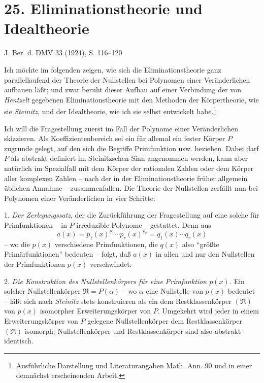 \documentclass[11pt]{article}
\begin{document}
\section*{25. Eliminationstheorie und Idealtheorie}

\begin{center}
J. Ber. d. DMV 33 (1924), S. 116--120
\end{center}

Ich möchte im folgenden zeigen, wie sich die Eliminationstheorie ganz parallellaufend der Theorie der Nullstellen bei Polynomen einer Veränderlichen aufbauen läßt; und zwar beruht dieser Aufbau auf einer Verbindung der von \emph{Hentzelt} gegebenen Eliminationstheorie mit den Methoden der Körpertheorie, wie sie \emph{Steinitz}, und der Idealtheorie, wie ich sie selbst entwickelt habe.\footnote{Ausführliche Darstellung und Literaturangaben Math. Ann. 90 und in einer demnächst erscheinenden Arbeit.}

Ich will die Fragestellung zuerst im Fall der Polynome einer Veränderlichen skizzieren. Als Koeffizientenbereich sei ein für allemal ein fester Körper $P$ zugrunde gelegt, auf den sich die Begriffe Primfunktion usw. beziehen. Dabei darf $P$ als abstrakt definiert im Steinitzschen Sinn angenommen werden, kann aber natürlich im Spezialfall mit dem Körper der rationalen Zahlen oder dem Körper aller komplexen Zahlen -- nach der in der Eliminationstheorie früher allgemein üblichen Annahme -- zusammenfallen. Die Theorie der Nullstellen zerfällt nun bei Polynomen einer Veränderlichen in vier Schritte:

1. \emph{Der Zerlegungssatz}, der die Zurückführung der Fragestellung auf eine solche für Primfunktionen -- in $P$ irreduzible Polynome -- gestattet. Denn aus
\[
 a(x)=p_1(x)^{\varrho_1}\cdots p_r(x)^{\varrho_r}=q_1(x)\cdots q_r(x)
\]
-- wo die $p(x)$ verschiedene Primfunktionen, die $q(x)$ also ``größte Primärfunktionen'' bedeuten -- folgt, daß $a(x)$ in allen und nur den Nullstellen der Primfunktionen $p(x)$ verschwindet.

2. \emph{Die Konstruktion des Nullstellenkörpers für eine Primfunktion $p(x)$.} Ein solcher Nullstellenkörper $\mathfrak R=P(\alpha)$ -- wo $\alpha$ eine Nullstelle von $p(x)$ bedeutet -- läßt sich nach \emph{Steinitz} stets konstruieren als ein dem Restklassenkörper $(\mathfrak R)$ von $p(x)$ isomorpher Erweiterungskörper von $P$. Umgekehrt wird jeder in einem Erweiterungskörper von $P$ gelegene Nullstellenkörper dem Restklassenkörper $(\mathfrak R)$ isomorph; Nullstellenkörper und Restklassenkörper sind also abstrakt identisch.
\end{document}
